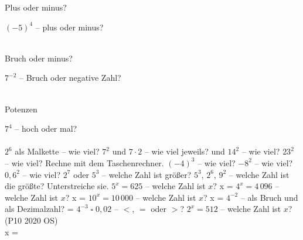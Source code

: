 \setcounter{aufgabe}{11}

\begin{aufgabe}{Plus oder minus?}
\begin{teile}
\teil $(-5)^4$ – plus oder minus?\\  \\ 
\end{teile}
\end{aufgabe}

\begin{aufgabe}{Bruch oder minus?}
\begin{teile}
\teil $7^{-2}$ – Bruch oder negative Zahl?\\  \\ 
\end{teile}
\end{aufgabe}

\begin{aufgabe}{Potenzen}
\begin{teile}
\teil $7^4$ – hoch oder mal?\\  \\ 
\teil $2^6$ als Malkette – wie viel? \leerfeld
\teil $7^2$ und $7 \cdot 2$ – wie viel jeweils? \leerfeld und \leerfeld
\teil $14^2$ – wie viel? \leerfeld
\teil $23^2$ – wie viel? Rechne mit dem Taschenrechner. \leerfeld
\teil $(-4)^3$ – wie viel? \leerfeld
\teil $-8^2$ – wie viel? \leerfeld
\teil $0{,}6^2$ – wie viel? \leerfeld
\teil $2^7$ oder $5^3$ – welche Zahl ist größer?
\teil $5^3$, $2^6$, $9^2$ – welche Zahl ist die größte? Unterstreiche sie.
\teil $5^x = 625$ – welche Zahl ist $x$? x = \leerfeld
\teil $4^x = 4\,096$ – welche Zahl ist $x$? x = \leerfeld
\teil $10^x = 10\,000$ – welche Zahl ist $x$? x = \leerfeld
\teil $4^{-2}$ – als Bruch und als Dezimalzahl? \leerfeld = \leerfeld
\teil $4^{-3} \;\square\; 0{,}02$ – $<$, $=$ oder $>$?
\teil $2^x = 512$ – welche Zahl ist $x$? \hfill (P10 2020 OS) \\ x = \leerfeld
\end{teile}
\end{aufgabe}

